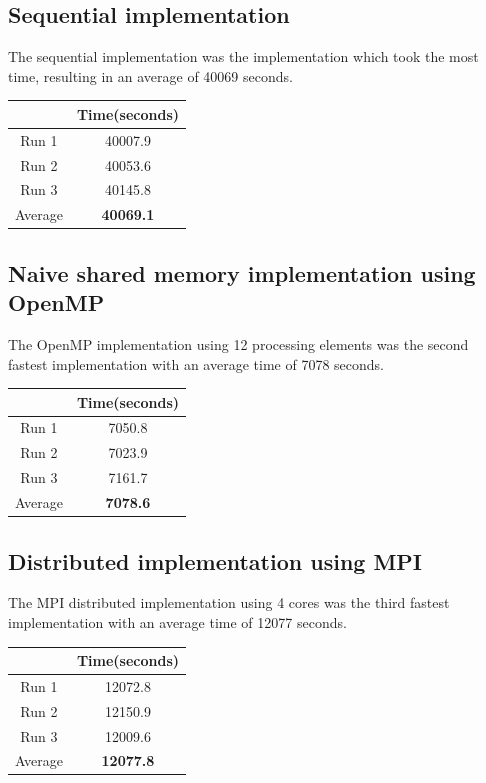 \documentclass[12pt]{IEEEtran}
\begin{document}
\subsection{Sequential implementation}
The sequential implementation was the implementation which took the most time, resulting in an average of 40069 seconds.

\begin{table}[H]
\centering
\captionsetup{justification=centering}
\renewcommand{\arraystretch}{1.3}
\begin{tabular}{|c|c|}
\hline
   & Time(seconds)\\
\hline
  Run 1 & 40007.9 \\
\hline
  Run 2 & 40053.6 \\
\hline
  Run 3 & 40145.8 \\
\hline
  Average & \textbf{40069.1} \\
\hline
\end{tabular}
\end{table}	

\subsection{Naive shared memory implementation using OpenMP}
The OpenMP implementation using 12 processing elements was the second fastest implementation with an average time of 7078 seconds.
\begin{table}[H]
\centering
\captionsetup{justification=centering}
\renewcommand{\arraystretch}{1.3}
\begin{tabular}{|c|c|}
\hline
   & Time(seconds)\\
\hline
  Run 1 & 7050.8\\
\hline
  Run 2 & 7023.9\\
\hline
  Run 3 & 7161.7\\
\hline
  Average & \textbf{7078.6}\\
\hline
\end{tabular}
\end{table}	

\subsection{Distributed implementation using MPI}
The MPI distributed implementation using 4 cores was the third fastest implementation with an average time of 12077 seconds.
\begin{table}[H]
\centering
\captionsetup{justification=centering}
\renewcommand{\arraystretch}{1.3}
\begin{tabular}{|c|c|}
\hline
   & Time(seconds)\\
\hline
  Run 1 & 12072.8\\
\hline
  Run 2 & 12150.9\\
\hline
  Run 3 & 12009.6\\
\hline
  Average & \textbf{12077.8}\\
\hline
\end{tabular}
\end{table}	
\end{document}
